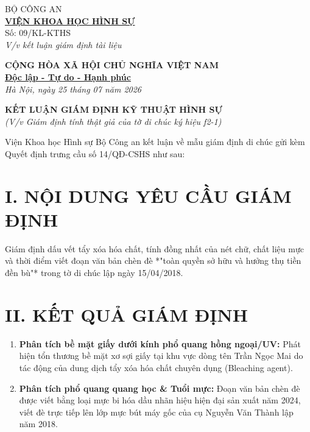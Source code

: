 \documentclass[12pt,a4paper]{article}
\begin{document}
\noindent
\begin{minipage}[t]{0.45\textwidth}
    \begin{center}
        \small
        BỘ CÔNG AN\\
        \textbf{\underline{VIỆN KHOA HỌC HÌNH SỰ}}\\[0.1cm]
        Số: 09/KL-KTHS\\
        \textit{V/v kết luận giám định tài liệu}
    \end{center}
\end{minipage}
\hfill
\begin{minipage}[t]{0.52\textwidth}
    \begin{center}
        \small
        \textbf{CỘNG HÒA XÃ HỘI CHỦ NGHĨA VIỆT NAM}\\
        \textbf{\underline{Độc lập - Tự do - Hạnh phúc}}\\[0.1cm]
        \textit{Hà Nội, ngày 25 tháng 07 năm 2026}
    \end{center}
\end{minipage}

\vspace{0.6cm}

\begin{center}
    \textbf{\large KẾT LUẬN GIÁM ĐỊNH KỸ THUẬT HÌNH SỰ}\\
    \textit{(V/v Giám định tính thật giả của tờ di chúc ký hiệu f2-1)}
\end{center}

\vspace{0.3cm}

\noindent Viện Khoa học Hình sự Bộ Công an kết luận về mẫu giám định di chúc gửi kèm Quyết định trưng cầu số 14/QĐ-CSHS như sau:

\section*{I. NỘI DUNG YÊU CẦU GIÁM ĐỊNH}
Giám định dấu vết tẩy xóa hóa chất, tính đồng nhất của nét chữ, chất liệu mực và thời điểm viết đoạn văn bản chèn đè *"toàn quyền sở hữu và hưởng thụ tiền đền bù"* trong tờ di chúc lập ngày 15/04/2018.

\section*{II. KẾT QUẢ GIÁM ĐỊNH}
\begin{enumerate}[label=\arabic*., leftmargin=1.5cm]
    \item \textbf{Phân tích bề mặt giấy dưới kính phổ quang hồng ngoại/UV:} Phát hiện tổn thương bề mặt xơ sợi giấy tại khu vực dòng tên Trần Ngọc Mai do tác động của dung dịch tẩy xóa hóa chất chuyên dụng (Bleaching agent).
    \item \textbf{Phân tích phổ quang quang học & Tuổi mực:} Đoạn văn bản chèn đè được viết bằng loại mực bi hóa dầu nhãn hiệu hiện đại sản xuất năm 2024, viết đè trực tiếp lên lớp mực bút máy gốc của cụ Nguyễn Văn Thành lập năm 2018.
\end{enumerate}
\end{document}
